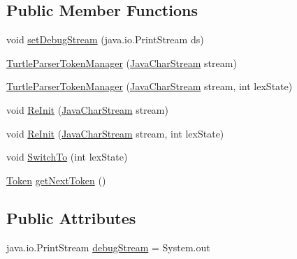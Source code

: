 \subsection*{Public Member Functions}
\begin{DoxyCompactItemize}
\item 
void \hyperlink{classuk_1_1ac_1_1manchester_1_1cs_1_1owl_1_1owlapi_1_1turtle_1_1parser_1_1_turtle_parser_token_manager_a64cae8912e307c4631a50f7ae302e550}{set\-Debug\-Stream} (java.\-io.\-Print\-Stream ds)
\item 
\hyperlink{classuk_1_1ac_1_1manchester_1_1cs_1_1owl_1_1owlapi_1_1turtle_1_1parser_1_1_turtle_parser_token_manager_a4b86c3cca9ad3533808bfb1cece825e2}{Turtle\-Parser\-Token\-Manager} (\hyperlink{classuk_1_1ac_1_1manchester_1_1cs_1_1owl_1_1owlapi_1_1turtle_1_1parser_1_1_java_char_stream}{Java\-Char\-Stream} stream)
\item 
\hyperlink{classuk_1_1ac_1_1manchester_1_1cs_1_1owl_1_1owlapi_1_1turtle_1_1parser_1_1_turtle_parser_token_manager_a3922a1823ac91af313d259df059ac180}{Turtle\-Parser\-Token\-Manager} (\hyperlink{classuk_1_1ac_1_1manchester_1_1cs_1_1owl_1_1owlapi_1_1turtle_1_1parser_1_1_java_char_stream}{Java\-Char\-Stream} stream, int lex\-State)
\item 
void \hyperlink{classuk_1_1ac_1_1manchester_1_1cs_1_1owl_1_1owlapi_1_1turtle_1_1parser_1_1_turtle_parser_token_manager_aa58cdca8a252742394243ad64ca03d3d}{Re\-Init} (\hyperlink{classuk_1_1ac_1_1manchester_1_1cs_1_1owl_1_1owlapi_1_1turtle_1_1parser_1_1_java_char_stream}{Java\-Char\-Stream} stream)
\item 
void \hyperlink{classuk_1_1ac_1_1manchester_1_1cs_1_1owl_1_1owlapi_1_1turtle_1_1parser_1_1_turtle_parser_token_manager_aac13512d6c994515b7e274d434f5b95e}{Re\-Init} (\hyperlink{classuk_1_1ac_1_1manchester_1_1cs_1_1owl_1_1owlapi_1_1turtle_1_1parser_1_1_java_char_stream}{Java\-Char\-Stream} stream, int lex\-State)
\item 
void \hyperlink{classuk_1_1ac_1_1manchester_1_1cs_1_1owl_1_1owlapi_1_1turtle_1_1parser_1_1_turtle_parser_token_manager_a1b4bc46812473626ce3fa9e800d0c509}{Switch\-To} (int lex\-State)
\item 
\hyperlink{classuk_1_1ac_1_1manchester_1_1cs_1_1owl_1_1owlapi_1_1turtle_1_1parser_1_1_token}{Token} \hyperlink{classuk_1_1ac_1_1manchester_1_1cs_1_1owl_1_1owlapi_1_1turtle_1_1parser_1_1_turtle_parser_token_manager_a19bd56af552f4f00f90d08023d9f0722}{get\-Next\-Token} ()
\end{DoxyCompactItemize}
\subsection*{Public Attributes}
\begin{DoxyCompactItemize}
\item 
java.\-io.\-Print\-Stream \hyperlink{classuk_1_1ac_1_1manchester_1_1cs_1_1owl_1_1owlapi_1_1turtle_1_1parser_1_1_turtle_parser_token_manager_a78127a1fb434d306868224985e70bf8a}{debug\-Stream} = System.\-out
\end{DoxyCompactItemize}
